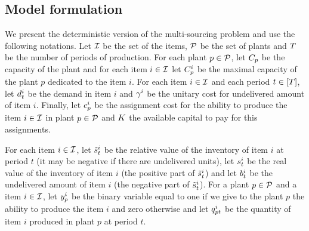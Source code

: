 \subsection{Model formulation}

We present the deterministic version of the multi-sourcing problem and use the following notations. Let $\mathcal{I}$ be the set of the items, $\mathcal{P}$ be the set of plants and $T$ be the number of periods of production. For each plant $p\in\mathcal{P}$, let $C_p$ be the capacity of the plant and for each item $i\in\mathcal{I}$ let $C_p^i$ be the maximal capacity of the plant $p$ dedicated to the item $i$. For each item $i\in\mathcal{I}$ and each period $t\in\range{\horizon}$, let $d_t^i$ be the demand in item $i$ and $\gamma^i$ be the unitary cost for undelivered amount of item $i$. Finally, let $c_p^i$ be the assignment cost for the ability to produce the item $i\in\mathcal{I}$ in plant $p\in\mathcal{P}$ and $K$ the available capital to pay for this assignments.

For each item $i\in\mathcal{I}$, let $\tilde{s}_t^i$ be the relative value of the inventory of item $i$ at period $t$ (\ie it may be negative if there are undelivered units), let $s_t^i$ be the real value of the inventory of item $i$ (\ie the positive part of $\tilde{s}_t^i$) and let $b_t^i$ be the undelivered amount of item $i$ (\ie the negative part of $\tilde{s}_t^i$). For a plant $p\in\mathcal{P}$ and a item $i\in\mathcal{I}$, let $y_p^i$ be the binary variable equal to one if we give to the plant $p$ the ability to produce the item $i$ and zero otherwise and let $q_{pt}^i$ be the quantity of item $i$ produced in plant $p$ at period $t$.

